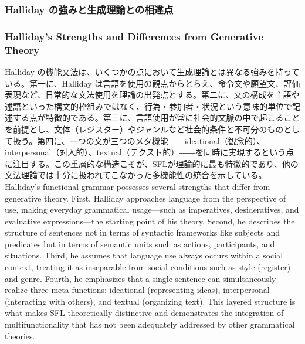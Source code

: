 \ifJPN
\subsubsection{Halliday の強みと生成理論との相違点}
\else
\subsubsection{Halliday's Strengths and Differences from Generative Theory}
\fi

\ifJPN
Halliday の機能文法は、いくつかの点において生成理論とは異なる強みを持っている。第一に、Halliday は言語を使用の観点からとらえ、命令文や願望文、評価表現など、日常的な文法使用を理論の出発点とする。第二に、文の構成を主語や述語といった構文的枠組みではなく、行為・参加者・状況という意味的単位で記述する点が特徴的である。第三に、言語使用が常に社会的文脈の中で起こることを前提とし、文体（レジスター）やジャンルなど社会的条件と不可分のものとして扱う。第四に、一つの文が三つのメタ機能――ideational（観念的）、interpersonal（対人的）、textual（テクスト的）――を同時に実現するという点に注目する。この重層的な構造こそが、SFLが理論的に最も特徴的であり、他の文法理論では十分に扱われてこなかった多機能性の統合を示している。
\else
Halliday's functional grammar possesses several strengths that differ from generative theory. First, Halliday approaches language from the perspective of use, making everyday grammatical usage—such as imperatives, desideratives, and evaluative expressions—the starting point of his theory. Second, he describes the structure of sentences not in terms of syntactic frameworks like subjects and predicates but in terms of semantic units such as actions, participants, and situations. Third, he assumes that language use always occurs within a social context, treating it as inseparable from social conditions such as style (register) and genre. Fourth, he emphasizes that a single sentence can simultaneously realize three meta-functions: ideational (representing ideas), interpersonal (interacting with others), and textual (organizing text). This layered structure is what makes SFL theoretically distinctive and demonstrates the integration of multifunctionality that has not been adequately addressed by other grammatical theories.
\fi


